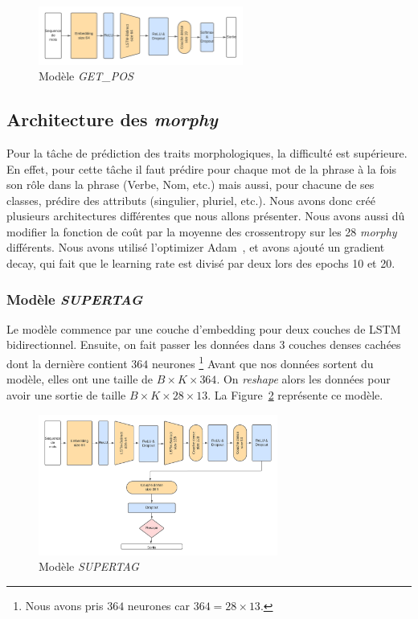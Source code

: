 \documentclass[a4paper]{article}
\begin{document}
\begin{figure}[H]
    \centering
    \includegraphics[width=0.6\textwidth]{get_pos.png}
    \caption{Modèle \textit{GET\_POS}}
    \label{fig: model getpos}
\end{figure} 

\subsection{Architecture des \textit{morphy}}

Pour la tâche de prédiction des traits morphologiques, la difficulté est supérieure. En effet, pour cette tâche 
il faut prédire pour chaque mot de la phrase à la fois son rôle dans la phrase (Verbe, Nom, etc.) mais aussi, 
pour chacune de ses classes, prédire des attributs (singulier, pluriel, etc.). Nous avons donc créé plusieurs 
architectures différentes que nous allons présenter. Nous avons aussi dû modifier la fonction de coût par 
la moyenne des crossentropy sur les 28 \textit{morphy} différents. Nous avons utilisé l'optimizer Adam~\cite{kingma2014adam},
et avons ajouté un gradient decay, qui fait que le learning rate est divisé par deux lors des epochs 10 et 20.

\subsubsection{Modèle \textit{SUPERTAG}}

Le modèle commence par une couche d'embedding pour deux couches de LSTM bidirectionnel. Ensuite, on fait passer les données 
dans 3 couches denses cachées dont la dernière contient $364$ neurones
\footnote{Nous avons pris $364$ neurones car $364 = 28 \times 13$.}
Avant que nos données sortent du modèle, elles ont une
taille de $B \times K \times 364$. On \textit{reshape} alors les données pour avoir une sortie de taille 
$B \times K \times 28 \times 13$. La Figure~\ref{fig: model supertag} représente ce modèle.

\begin{figure}[H]
    \centering
    \includegraphics[width=0.7\textwidth]{get_morphy_supertag.png}
    \caption{Modèle \textit{SUPERTAG}}
    \label{fig: model supertag}
\end{figure}
\end{document}
